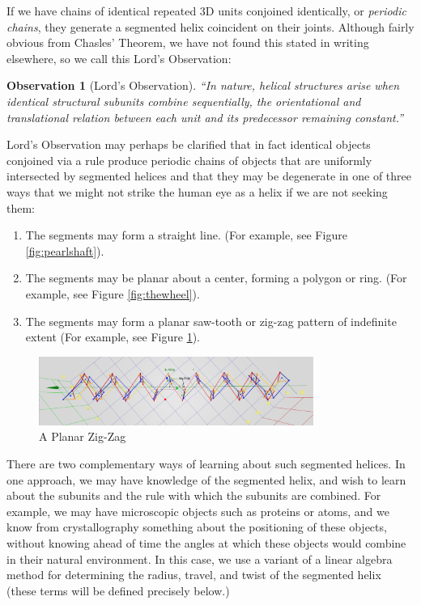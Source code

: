 \documentclass[11pt]{article}
\newtheorem{observation}{Observation}
\begin{document}
{If we have chains of identical repeated 3D units conjoined identically, or {\em periodic chains},
they generate a segmented helix coincident on their joints.
Although fairly obvious from Chasles' Theorem, we have not found this stated in writing elsewhere, so we call this Lord's Observation:

\begin{observation}[Lord's Observation]
  “In nature, helical structures arise when identical structural subunits combine sequentially, the orientational and translational relation between each unit and its predecessor remaining constant.”\cite{lord2002helical}
\end{observation}
Lord's Observation may perhaps be clarified that in fact identical objects conjoined via a rule
produce periodic chains of objects that are uniformly intersected by segmented helices and that they may be degenerate in one of
three ways that we might not strike the human eye as a helix if we are not seeking them:
\begin{enumerate}
\item The segments may form a straight line. (For example, see Figure \ref{fig:pearlshaft}).
\item The segments may be planar about a center, forming a polygon or ring. (For example, see Figure \ref{fig:thewheel}).
\item The segments may form a planar saw-tooth or zig-zag pattern of indefinite extent (For example, see Figure \ref{fig:planarzigzag}).
\end{enumerate}

\begin{figure}
     \centering
     \includegraphics[width=0.80\textwidth]{figures/PlanarZigZag.png}
     \caption{A Planar Zig-Zag}
  \label{fig:planarzigzag}
\end{figure}

There are two complementary ways of learning about such segmented helices.
In one approach, we may have knowledge of the segmented helix, and
wish to learn about the subunits and the rule with which the subunits are combined.
For example, we may have microscopic objects such as proteins
or atoms, and we know from crystallography something about the positioning of these objects, without
knowing ahead of time the angles at which these objects would combine in their natural environment.
In this case, we use a variant of a linear algebra method\cite{kahn1989defining} for determining the radius, travel, and twist
of the segmented helix (these terms will be defined precisely below.)

}
\end{document}
